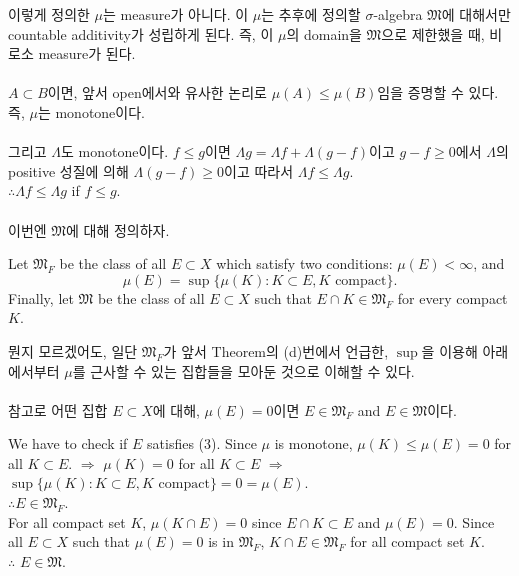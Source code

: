 \documentclass[11pt,reqno]{amsart}
\renewcommand{\(}{\left(}
\renewcommand{\)}{\right)}
\renewcommand{\[}{\left[}
\renewcommand{\]}{\right]}
\newenvironment{textbox}
  {\begin{tcolorbox}[
    colback=gray!10, 
    colframe=gray!50, 
    boxrule=0.5pt,
    fontupper=\normalfont
  ]}
  {\end{tcolorbox}}
\newcommand{\subheading}[1]{\vspace{1em}{\noindent\large\bfseries \textlangle{} #1 \textrangle{} \par}\vspace{1em}}
\newcommand{\M}{\mathfrak{M}}
\begin{document}
이렇게 정의한 $\mu$는 measure가 아니다. 이 $\mu$는 추후에 정의할 $\sigma$-algebra $\M$에 대해서만 countable 
additivity가 성립하게 된다. 즉, 이 $\mu$의 domain을 $\M$으로 제한했을 때, 비로소 measure가 된다.\\ \\
$A \subset B$이면, 앞서 open에서와 유사한 논리로 $\mu(A) \le \mu(B)$임을 증명할 수 있다. 즉, $\mu$는 monotone이다.\\ \\
그리고 $\Lambda$도 monotone이다. $f \le g$이면 $\Lambda g = \Lambda f + \Lambda (g - f)$이고 $g - f \ge 0$에서 
$\Lambda$의 positive 성질에 의해 $\Lambda (g - f) \ge 0$이고 따라서 $\Lambda f \le \Lambda g$. \\
$\therefore \Lambda f \le \Lambda g$ if $f \le g$. \\ \\

이번엔 $\M$에 대해 정의하자.
\begin{textbox}
  Let $\M_F$ be the class of all $E \subset X$ which satisfy two conditions: $\mu(E) < \infty$, and 
  \begin{equation}
    \mu(E) = \sup \{ \mu(K) : K \subset E, K \text{ compact} \}.
  \end{equation}
  Finally, let $\M$ be the class of all $E \subset X$ such that $E \cap K \in \M_F$ for every compact $K$.
\end{textbox}

뭔지 모르겠어도, 일단 $\M_F$가 앞서 Theorem의 (d)번에서 언급한, $\sup$을 이용해 아래에서부터 $\mu$를 근사할 수 있는 
집합들을 모아둔 것으로 이해할 수 있다. \\ \\

참고로 어떤 집합 $E \subset X$에 대해, $\mu(E)=0$이면 $E \in \M_F$ and $E \in \M$이다.

\subheading{proof}

\begin{textbox}
  We have to check if $E$ satisfies (3). Since $\mu$ is monotone, $\mu(K) \le \mu(E) = 0$ for all $K \subset E$. 
  $\Rightarrow$ $\mu(K) = 0$ for all $K \subset E$ $\Rightarrow$ 
  $\sup \{ \mu(K) : K \subset E, K \text{ compact} \} = 0 = \mu(E)$. \\
  $\therefore E \in \M_F$. \\
  For all compact set $K$, $\mu(K \cap E) = 0$ since $E \cap K \subset E$ and $\mu(E) = 0$. 
  Since all $E \subset X$ such that $\mu(E) = 0$ is in $\M_F$, $K \cap E \in \M_F$ for all compact set $K$. \\
  $\therefore$ $E \in \M$.
\end{textbox}
\end{document}
